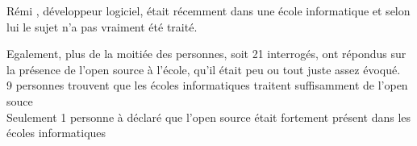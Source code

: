 				Rémi , développeur logiciel, était récemment dans une école informatique et selon lui le sujet n'a pas vraiment été traité.

				\begin{center}
					\textit{
					}
				\end{center}

				Egalement, plus de la moitiée des personnes, soit 21 interrogés, ont répondus sur la présence de l'open source à l'école, qu'il était peu ou tout juste assez évoqué.\\

				9 personnes trouvent que les écoles informatiques traitent suffisamment de l'open souce\\

				Seulement 1 personne à déclaré que l'open source était fortement présent dans les écoles informatiques

